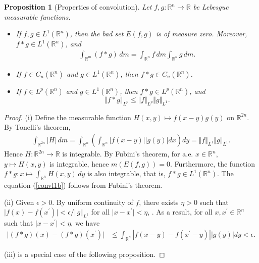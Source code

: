 \documentclass{article}
\numberwithin{equation}{section}
\newcommand{\bbR}{\mathbb{R}}
\theoremstyle{plain}
\newtheorem{proposition}[theorem]{Proposition}
\theoremstyle{definition}
\begin{document}
\begin{proposition}[Properties of convolution]\label{prop:1.2}
	Let $f,g:\mathbb{R}^n\to\mathbb{R}$ be Lebesgue measurable functions.
	\begin{itemize}
		\item[(i)] If $f,g\in L^1(\mathbb{R}^n)$, then the bad set $E(f,g)$ is of measure zero. Moreover, $f*g\in L^1(\mathbb{R}^n)$, and
		\begin{align}
			\int_{\bbR^m} (f*g)\,dm = \int_{\bbR^n}f\,dm\int_{\bbR^n}g\,dm.\label{convl1b}
		\end{align}
		\item[(ii)] If $f\in C_u(\mathbb{R}^n)$ and $g\in L^1(\mathbb{R}^n)$, then $f*g\in C_u(\mathbb{R}^n)$.
		\item[(iii)] If $f\in L^p(\bbR^n)$ and $g\in L^1(\bbR^n)$, then $f*g\in L^p(\bbR^n)$, and $$\Vert f*g\Vert_{L^p}\leq\Vert f\Vert_{L^p}\Vert g\Vert_{L^1}.$$
	\end{itemize}
\end{proposition}
\begin{proof}
	(i) Define the measurable function $H(x,y)\mapsto f(x-y)g(y)$ on $\mathbb{R}^{2n}$. By Tonelli's theorem, 
	\begin{align*}
		\int_{\mathbb{R}^{2n}}\vert H\vert\,dm = \int_{\bbR^n}\left(\int_{\bbR^n} \left\vert f(x-y)\right\vert\left\vert g(y)\right\vert dx\right)dy = \Vert f\Vert_{L^1}\Vert g\Vert_{L^1}.
	\end{align*}
	Hence $H:\mathbb{R}^{2n}\to\mathbb{R}$ is integrable. By Fubini's theorem, for a.e. $x\in\mathbb{R}^n$, $y\mapsto H(x,y)$ is integrable, hence $m(E(f,g))=0$. Furthermore, the function $f*g:x\mapsto \int_{\bbR^n}H(x,y)\,dy$ is also integrable, that is, $f*g\in L^1(\mathbb{R}^n)$. The equation (\ref{convl1b}) follows from Fubini's theorem.
	\vspace{0.1cm}
	
	(ii) Given $\epsilon>0$. By uniform continuity of $f$, there exists $\eta > 0$ such that $\vert f(x) - f(x^\prime)\vert < \epsilon/\Vert g\Vert_{L^1}$ for all $\vert x-x^\prime\vert < \eta$, . As a result, for all $x,x^\prime\in\mathbb{R}^n$ such that $\vert x-x^\prime\vert < \eta$, we have
	\begin{align*}
		\vert(f*g)(x) - (f*g)(x^\prime)\vert
		&\leq \int_{\bbR^n} \left\vert f(x-y) - f(x^\prime-y)\right\vert \left\vert g(y)\right\vert dy < \epsilon.
	\end{align*}
	
	(iii) is a special case of the following proposition.
\end{proof}
\end{document}
